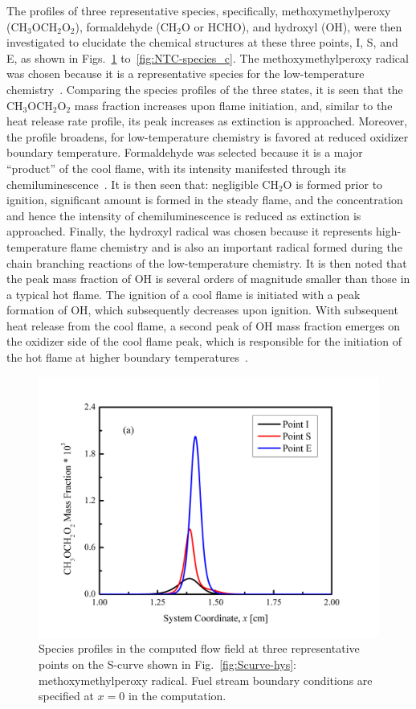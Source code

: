 The profiles of three representative species, specifically, methoxymethylperoxy (CH$_3$OCH$_2$O$_2$), formaldehyde (CH$_2$O or HCHO), and hydroxyl (OH), were then investigated to elucidate the chemical structures at these three points, I, S, and E, as shown in Figs.~\ref{fig:NTC-species_a} to~\ref{fig:NTC-species_c}.  The methoxymethylperoxy radical was chosen because it is a representative species for the low-temperature chemistry~\cite{krisman15}.  Comparing the species profiles of the three states, it is seen that the CH$_3$OCH$_2$O$_2$ mass fraction increases upon flame initiation, and, similar to the heat release rate profile, its peak increases as extinction is approached.  Moreover, the profile broadens, for low-temperature chemistry is favored at reduced oxidizer boundary temperature.  Formaldehyde was selected because it is a major “product” of the cool flame, with its intensity manifested through its chemiluminescence~\cite{zhao16}.  It is then seen that: negligible CH$_2$O is formed prior to ignition, significant amount is formed in the steady flame, and the concentration and hence the intensity of chemiluminescence is reduced as extinction is approached. Finally, the hydroxyl radical was chosen because it represents high-temperature flame chemistry and is also an important radical formed during the chain branching reactions of the low-temperature chemistry.  It is then noted that the peak mass fraction of OH is several orders of magnitude smaller than those in a typical hot flame.  The ignition of a cool flame is initiated with a peak formation of OH, which subsequently decreases upon ignition.  With subsequent heat release from the cool flame, a second peak of OH mass fraction emerges on the oxidizer side of the cool flame peak, which is responsible for the initiation of the hot flame at higher boundary temperatures~\cite{law12}.

\begin{figure}[t]
  \centering
  \scriptsize
  \includegraphics[width=1.0\textwidth]{ch-NTC/sp_a.png}
  \normalsize
  \caption{Species profiles in the computed flow field at three representative points on the S-curve shown in Fig.~\ref{fig:Scurve-hys}: methoxymethylperoxy radical.  Fuel stream boundary conditions are specified at $x=0$ in the computation.}
  \label{fig:NTC-species_a}
\end{figure}

